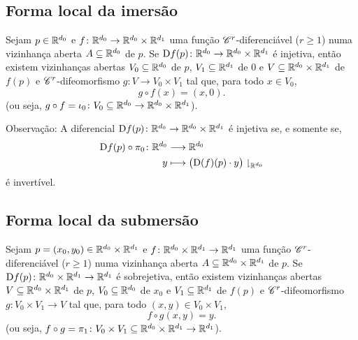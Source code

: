 \subsection{Forma local da imersão}

\begin{proposition}

Sejam $p \in \mathbb{R}^{d_0}$ e $f\colon \mathbb{R}^{d_0} \to \mathbb{R}^{d_0} \times \mathbb{R}^{d_1}$ uma função $\mathscr{C}^r$-diferenciável ($r \geq 1$) numa vizinhança aberta $A \subseteq \mathbb{R}^{d_0}$ de $p$. Se $\mathrm{D} f(p) \colon \mathbb{R}^{d_0} \to \mathbb{R}^{d_0} \times \mathbb{R}^{d_1}$ é injetiva, então existem vizinhanças abertas $V_0 \subseteq \mathbb{R}^{d_0}$ de $p$, $V_1 \subseteq \mathbb{R}^{d_1}$ de $0$ e $V \subseteq \mathbb{R}^{d_0} \times \mathbb{R}^{d_1}$ de $f(p)$ e $\mathscr{C}^r$-difeomorfismo $g\colon V \to V_0 \times V_1$ tal que, para todo $x \in V_0$,
	\begin{equation*}
	g \circ f(x)=(x,0).
	\end{equation*}
(ou seja, $g \circ f = \iota_0\colon V_0 \subseteq \mathbb{R}^{d_0} \to \mathbb{R}^{d_0} \times \mathbb{R}^{d_1}$).
\end{proposition}

Observação: A diferencial $\mathrm{D} f(p)\colon \mathbb{R}^{d_0} \to \mathbb{R}^{d_0} \times \mathbb{R}^{d_1}$ é injetiva se, e somente se,
	\begin{align*}
	{\mathrm{D}f(p) \circ \pi_0}\colon {\mathbb{R}^{d_0}} &\longrightarrow {\mathbb{R}^{d_0}} \\{y} &\longmapsto \big(\mathrm{D}(f)(p) \cdot y\big)\downharpoonright_{\mathbb{R}^{d_0}}
	\end{align*}
é invertível.


\subsection{Forma local da submersão}

\begin{proposition}

Sejam $p=(x_0,y_0) \in \mathbb{R}^{d_0} \times \mathbb{R}^{d_1}$ e $f\colon \mathbb{R}^{d_0} \times \mathbb{R}^{d_1} \to \mathbb{R}^{d_1}$ uma função $\mathscr{C}^r$-diferenciável ($r \geq 1$) numa vizinhança aberta $A \subseteq \mathbb{R}^{d_0} \times \mathbb{R}^{d_1}$ de $p$. Se $\mathrm{D} f(p)\colon \mathbb{R}^{d_0} \times \mathbb{R}^{d_1} \to \mathbb{R}^{d_1}$ é sobrejetiva, então existem vizinhanças abertas $V \subseteq \mathbb{R}^{d_0} \times \mathbb{R}^{d_1}$ de $p$, $V_0 \subseteq \mathbb{R}^{d_0}$ de $x_0$ e $V_1 \subseteq \mathbb{R}^{d_1}$ de $f(p)$ e $\mathscr{C}^r$-difeomorfismo $g\colon V_0 \times V_1 \to V$ tal que, para todo $(x,y) \in V_0 \times V_1$,
	\begin{equation*}
	f \circ g(x,y)=y.
	\end{equation*}
(ou seja, $f \circ g = \pi_1\colon V_0 \times V_1 \subseteq \mathbb{R}^{d_0} \times \mathbb{R}^{d_1} \to \mathbb{R}^{d_1}$).
\end{proposition}

